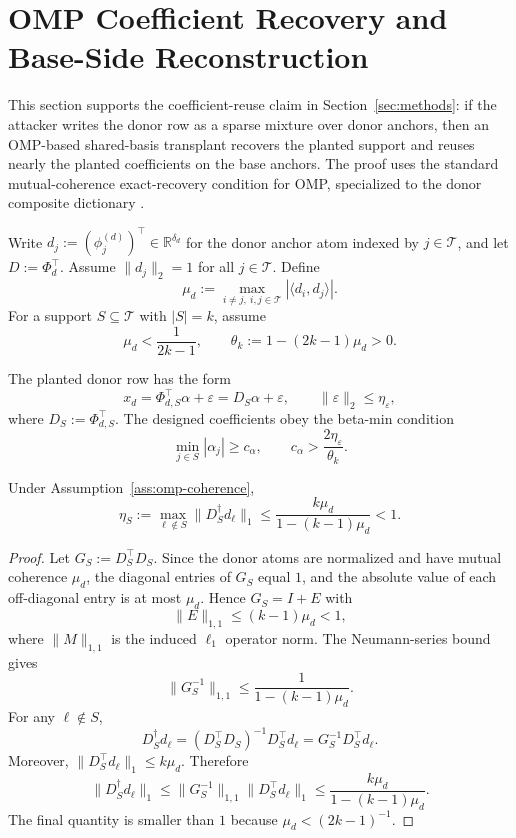 \section{OMP Coefficient Recovery and Base-Side Reconstruction}
\label{app:omp-coefficient-recovery}

This section supports the coefficient-reuse claim in Section~\ref{sec:methods}: if the attacker writes the donor row as a sparse mixture over donor anchors, then an OMP-based shared-basis transplant recovers the planted support and reuses nearly the planted coefficients on the base anchors. The proof uses the standard mutual-coherence exact-recovery condition for OMP, specialized to the donor composite dictionary \citep{tropp2004greed,troppgilbert2007omp,donohoeladtemlyakov2006stable,caiwang2011omp}.

\begin{assumption}
\label{ass:omp-coherence}
Write $d_j := (\phi_j^{(d)})^\top \in \mathbb{R}^{\delta_d}$ for the donor anchor atom indexed by $j \in \mathcal{T}$, and let $D := \Phi_d^\top$. Assume $\|d_j\|_2=1$ for all $j\in\mathcal{T}$. Define
\[
\mu_d := \max_{i\neq j,\ i,j\in\mathcal{T}} |\langle d_i,d_j\rangle|.
\]
For a support $S\subseteq\mathcal{T}$ with $|S|=k$, assume
\[
\mu_d < \frac{1}{2k-1},
\qquad
\theta_k := 1-(2k-1)\mu_d > 0.
\]
\end{assumption}

\begin{assumption}
\label{ass:omp-noisy-row}
The planted donor row has the form
\[
x_d = \Phi_{d,S}^\top \alpha + \varepsilon = D_S\alpha+\varepsilon,
\qquad
\|\varepsilon\|_2 \le \eta_\varepsilon,
\]
where $D_S:=\Phi_{d,S}^\top$. The designed coefficients obey the beta-min condition
\[
\min_{j\in S}|\alpha_j| \ge c_\alpha,
\qquad
c_\alpha > \frac{2\eta_\varepsilon}{\theta_k}.
\]
\end{assumption}

\begin{lemma}
\label{lem:coherence-erc}
Under Assumption~\ref{ass:omp-coherence},
\[
\eta_S := \max_{\ell\notin S} \|D_S^\dagger d_\ell\|_1
\le
\frac{k\mu_d}{1-(k-1)\mu_d}
< 1.
\]
\end{lemma}

\begin{proof}
Let $G_S:=D_S^\top D_S$. Since the donor atoms are normalized and have mutual coherence $\mu_d$, the diagonal entries of $G_S$ equal $1$, and the absolute value of each off-diagonal entry is at most $\mu_d$. Hence $G_S=I+E$ with
\[
\|E\|_{1,1}\le (k-1)\mu_d < 1,
\]
where $\|M\|_{1,1}$ is the induced $\ell_1$ operator norm. The Neumann-series bound gives
\[
\|G_S^{-1}\|_{1,1}
\le
\frac{1}{1-(k-1)\mu_d}.
\]
For any $\ell\notin S$,
\[
D_S^\dagger d_\ell=(D_S^\top D_S)^{-1}D_S^\top d_\ell=G_S^{-1}D_S^\top d_\ell.
\]
Moreover, $\|D_S^\top d_\ell\|_1 \le k\mu_d$. Therefore
\[
\|D_S^\dagger d_\ell\|_1
\le
\|G_S^{-1}\|_{1,1}\|D_S^\top d_\ell\|_1
\le
\frac{k\mu_d}{1-(k-1)\mu_d}.
\]
The final quantity is smaller than $1$ because $\mu_d < (2k-1)^{-1}$.
\end{proof}


